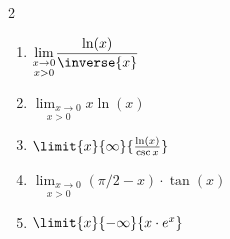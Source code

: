   \begin{ProblemSection}
    \begin{embeddedproblem}{}
      \begin{multicols}{2}
        \begin{enumerate}[label={\bf{}(\alph*)}]
        \item $\displaystyle\underset{x>0}{\lim_{x\rightarrow 0}}\frac{\ln(x)}{\inverse{x}}$
        \item $\displaystyle\underset{x>0}{\lim_{x\rightarrow 0}}x\ln(x)$
        \item $\limit{x}{\infty}{\frac{\ln(x)}{\csc{x}}}$
        \item $\displaystyle\underset{x>0}{\lim_{x\rightarrow 0}}\left(\pi/2-x\right)\cdot\tan(x)$
        \item $\limit{x}{-\infty}{x\cdot e^x}$
        \end{enumerate}
      \end{multicols}
    \end{embeddedproblem}
  \end{ProblemSection}

